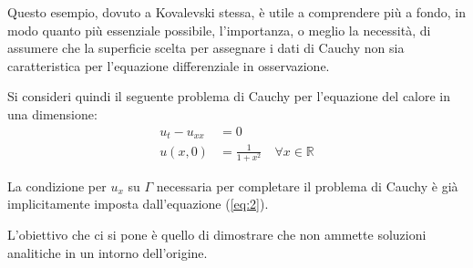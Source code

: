 \begin{example}

Questo esempio, dovuto a Kovalevski stessa, è utile a comprendere più a fondo, in modo quanto più essenziale possibile, 
l'importanza, o meglio la necessità, di assumere che la superficie scelta per assegnare i dati di Cauchy non sia caratteristica 
per l'equazione differenziale in osservazione.
 
Si consideri quindi il seguente problema di Cauchy per l'equazione del calore in una dimensione:
\begin{align} 
\label{eq:1}
u_t-u_{xx}&=0\\ 
\label{eq:2}
u(x,0)&=\frac{1}{1+x^2} \quad \forall x \in \mathbb{R}
\end{align}
\begin{remark}
La condizione per $u_x$ su $\Gamma$ necessaria per completare il problema di Cauchy è già implicitamente imposta dall'equazione
(\ref{eq:2}).
\end{remark}
L'obiettivo che ci si pone è quello di dimostrare che non ammette soluzioni analitiche in un intorno dell'origine.


\end{example}
